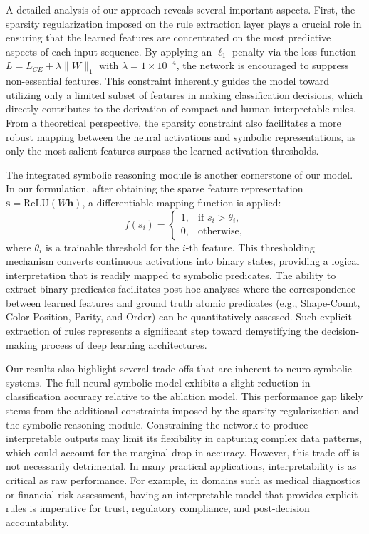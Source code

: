 \documentclass{article}
\begin{document}
A detailed analysis of our approach reveals several important aspects. First, the sparsity regularization imposed on the rule extraction layer plays a crucial role in ensuring that the learned features are concentrated on the most predictive aspects of each input sequence. By applying an \(\ell_1\) penalty via the loss function \(L = L_{CE} + \lambda \|W\|_1\) with \(\lambda=1 \times 10^{-4}\), the network is encouraged to suppress non-essential features. This constraint inherently guides the model toward utilizing only a limited subset of features in making classification decisions, which directly contributes to the derivation of compact and human-interpretable rules. From a theoretical perspective, the sparsity constraint also facilitates a more robust mapping between the neural activations and symbolic representations, as only the most salient features surpass the learned activation thresholds.

The integrated symbolic reasoning module is another cornerstone of our model. In our formulation, after obtaining the sparse feature representation \(\mathbf{s} = \text{ReLU}(W\mathbf{h})\), a differentiable mapping function is applied:
\[
f(s_i) = \begin{cases}
1, & \text{if } s_i > \theta_i, \\
0, & \text{otherwise},
\end{cases}
\]
where \(\theta_i\) is a trainable threshold for the \(i\)-th feature. This thresholding mechanism converts continuous activations into binary states, providing a logical interpretation that is readily mapped to symbolic predicates. The ability to extract binary predicates facilitates post-hoc analyses where the correspondence between learned features and ground truth atomic predicates (e.g., Shape-Count, Color-Position, Parity, and Order) can be quantitatively assessed. Such explicit extraction of rules represents a significant step toward demystifying the decision-making process of deep learning architectures.

Our results also highlight several trade-offs that are inherent to neuro-symbolic systems. The full neural-symbolic model exhibits a slight reduction in classification accuracy relative to the ablation model. This performance gap likely stems from the additional constraints imposed by the sparsity regularization and the symbolic reasoning module. Constraining the network to produce interpretable outputs may limit its flexibility in capturing complex data patterns, which could account for the marginal drop in accuracy. However, this trade-off is not necessarily detrimental. In many practical applications, interpretability is as critical as raw performance. For example, in domains such as medical diagnostics or financial risk assessment, having an interpretable model that provides explicit rules is imperative for trust, regulatory compliance, and post-decision accountability.
\end{document}
